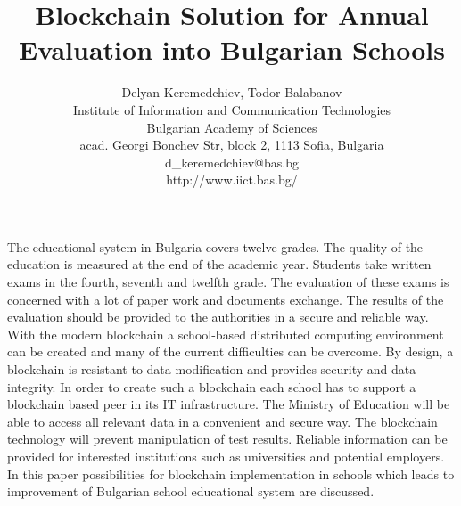 \documentclass[12pt,a4paper]{article}
\title{\bf Blockchain Solution for Annual Evaluation into Bulgarian Schools}
\author{Delyan Keremedchiev, Todor Balabanov \\
Institute of Information and Communication Technologies \\
Bulgarian Academy of Sciences \\
acad. Georgi Bonchev Str, block 2, 1113 Sofia, Bulgaria \\
d\_keremedchiev@bas.bg \\
http://www.iict.bas.bg/}
\date{}
\begin{document}
\maketitle

The educational system in Bulgaria covers twelve grades. The quality of the education is measured at the end of the academic year. Students take written exams in the fourth, seventh and twelfth grade. The evaluation of these exams is concerned with a lot of paper work and documents exchange. The results of the evaluation should be provided to the authorities in a secure and reliable way. With the modern blockchain a school-based distributed computing environment can be created and many of the current difficulties can be overcome. By design, a blockchain is resistant to data modification and provides security and data integrity. In order to create such a blockchain each school has to support a blockchain based peer in its IT infrastructure. The Ministry of Education will be able to access all relevant data in a convenient and secure way. The blockchain technology will prevent manipulation of  test results. Reliable information can be provided for interested institutions such as universities and potential employers. In this paper possibilities for blockchain implementation in schools which leads to improvement of  Bulgarian school educational system are discussed.
\end{document}
